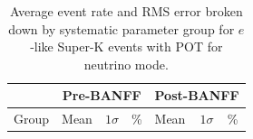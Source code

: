 \begin{table}[H]
	\centering
	\begin{tabular}{|l||l|l|l||l|l|l|}
		\hline
		& \multicolumn{3}{c||}{\textbf{Pre-BANFF}} & \multicolumn{3}{c|}{\textbf{Post-BANFF}} \\ \hline
		Group        & Mean       & $1\sigma$       & \%       & Mean        & $1\sigma$       & \%       \\ \hline\hline
		
		
		
		
		
		
		\hline
		
		
	\end{tabular}
	\caption
	{
	Average event rate and RMS error broken down by systematic parameter group for $e$-like Super-K events with \RunPeriod POT for neutrino mode.
	}
	\label{tab:sk_errors_1Re}
\end{table}